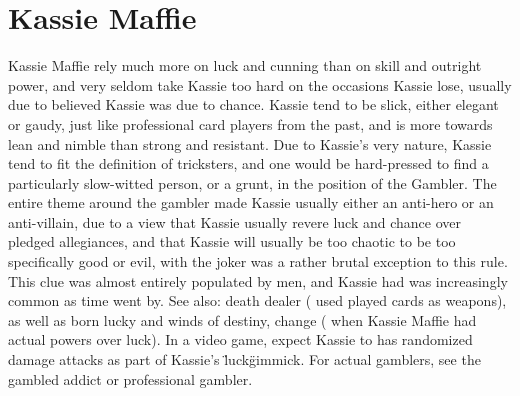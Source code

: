 \documentclass[12pt]{book}
\begin{document}
\chapter{Kassie Maffie}

Kassie Maffie rely much more on luck and cunning than on skill and outright power, and very seldom take Kassie too hard on the occasions Kassie lose, usually due to believed Kassie was due to chance. Kassie tend to be slick, either elegant or gaudy, just like professional card players from the past, and is more towards lean and nimble than strong and resistant. Due to Kassie's very nature, Kassie tend to fit the definition of tricksters, and one would be hard-pressed to find a particularly slow-witted person, or a grunt, in the position of the Gambler. The entire theme around the gambler made Kassie usually either an anti-hero or an anti-villain, due to a view that Kassie usually revere luck and chance over pledged allegiances, and that Kassie will usually be too chaotic to be too specifically good or evil, with the joker was a rather brutal exception to this rule. This clue was almost entirely populated by men, and Kassie had was increasingly common as time went by. See also: death dealer ( used played cards as weapons), as well as born lucky and winds of destiny, change ( when Kassie Maffie had actual powers over luck). In a video game, expect Kassie to has randomized damage attacks as part of Kassie's \"luck\" gimmick. For actual gamblers, see the gambled addict or professional gambler.
\end{document}
